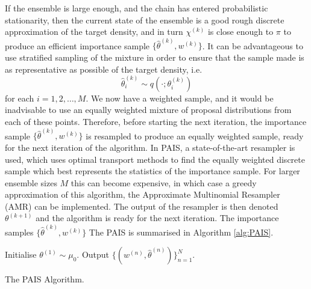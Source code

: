 \documentclass[final]{siamltex}
\begin{document}
If the ensemble is large enough, and the chain has entered
probabilistic stationarity, then the current state of the ensemble is
a good rough discrete approximation of the target density, and in turn
$\chi^{(k)}$ is close enough to $\pi$ to produce an efficient importance
sample $\{\hat{\theta}^{(k)},w^{(k)}\}$. It can be advantageous to use stratified sampling of the
mixture in order to
ensure that the sample made is as representative as possible of the
target density, i.e.
\[ \hat{\theta}_i^{(k)} \sim q(\cdot ; \theta_i^{(k)})\]
for each $i = 1,2,\ldots,M$. We now have a weighted sample, and it
would be inadvisable to use an equally weighted mixture of proposal
distributions from each of these points. Therefore, before starting
the next iteration, the importance sample
$\{\hat{\theta}^{(k)},w^{(k)}\}$ is resampled to produce an equally
weighted sample, ready for the next iteration of the algorithm. In
PAIS, a state-of-the-art resampler is used, which uses optimal
transport methods to find the equally weighted discrete sample which
best represents the statistics of the importance
sample\cite{reich2013nonparametric}. For larger ensemble sizes $M$ this can become
expensive, in which case a greedy approximation of this algorithm, the
Approximate Multinomial Resampler (AMR) can be
implemented\cite{cotter2015parallel}. The output of the resampler is then denoted
$\theta^{(k+1)}$ and the algorithm is ready for the next
iteration. The importance samples $\{\hat{\theta}^{(k)},w^{(k)}\}$ The PAIS is summarised in Algorithm \ref{alg:PAIS}.

\begin{table}[!h]
\centering
\begin{algorithm}[H]
\DontPrintSemicolon
\BlankLine
	Initialise $\theta^{(1)} \sim \mu_0$.\;
	Output $\{(w^{(n)}, \hat{\theta}^{(n)})\}_{n=1}^N$.
\caption{The PAIS Algorithm.\label{alg:PAIS}}
\end{algorithm}
\end{table}
\end{document}
